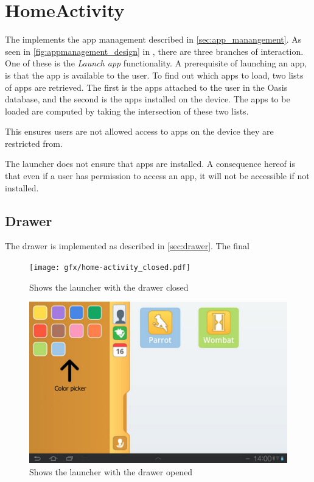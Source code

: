 \section{HomeActivity}
The  implements the app management described in \autoref{sec:app_manangement}. 
As seen in \autoref{fig:appmanagement_design} in , there are three branches of interaction. 
One of these is the \emph{Launch app} functionality.
A prerequisite of launching an app, is that the app is available to the user. 
To find out which apps to load, two lists of apps are retrieved. 
The first is the apps attached to the user in the Oasis database, and the second is the apps installed on the device.
The apps to be loaded are computed by taking the intersection of these two lists.

This ensures users are not allowed access to apps on the device they are restricted from.

The launcher does not ensure that apps are installed. 
A consequence hereof is that even if a user has permission to access an app, it will not be accessible if not installed.

\subsection{Drawer}
The drawer is implemented as described in \autoref{sec:drawer}.
The final 

\begin{figure}[h!]
	\centering
	\texttt{[image: gfx/home-activity\_closed.pdf]}
	\caption{Shows the launcher with the drawer closed}
	\label{fig:home-activity_closed}
\end{figure}

\begin{figure}[h!]
	\centering
	\includegraphics[scale=0.2]{gfx/home-activity_open.pdf}
	\caption{Shows the launcher with the drawer opened}
	\label{fig:home-activity}
\end{figure}


